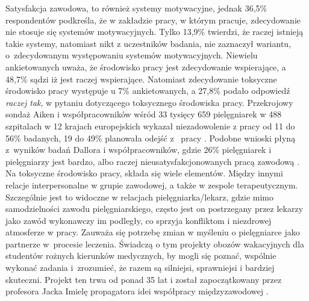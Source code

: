 \documentclass[a4paper,12pt,twoside,openright]{mwrep}
\begin{document}
Satysfakcja zawodowa, to również systemy motywacyjne, jednak 36,5\% respondentów podkreśla, że w zakładzie pracy, w którym pracuje, zdecydowanie nie stosuje się systemów motywacyjnych. Tylko 13,9\% twierdzi, że raczej istnieją takie systemy, natomiast nikt z uczestników badania, nie zaznaczył wariantu, o~zdecydowanym występowaniu systemów motywacyjnych.  Niewielu  ankietowanych uważa, że środowisko pracy jest zdecydowanie wspierające, a 48,7\%  sądzi  iż jest raczej wspierające. Natomiast zdecydowanie toksyczne środowisko pracy występuje u 7\%  ankietowanych, a 27,8\%  podało odpowiedź \textit{raczej tak}, w pytaniu dotyczącego toksycznego środowiska pracy.  Przekrojowy sondaż Aiken i współpracowników wśród  33 tysięcy 659 pielęgniarek w 488 szpitalach w 12 krajach europejskich wykazał niezadowolenie z pracy  od 11 do 56\% badanych, 19 do 49\% planowała odejść z~ pracy \cite{termedia}. Podobne wnioski płyną z~wyników badań Dallora i współpracowników, gdzie 26\% pielęgniarek i pielęgniarzy jest bardzo, albo raczej nieusatysfakcjonowanych pracą zawodową \cite{dalora}. Na toksyczne środowisko pracy, składa się wiele elementów. Między innymi relacje interpersonalne w grupie zawodowej, a także w zespole terapeutycznym. Szczególnie jest to widoczne w relacjach pielęgniarka/lekarz, gdzie mimo samodzielności zawodu pielęgniarskiego, często jest on postrzegany przez lekarzy jako zawód wykonawczy im  podległy, co sprzyja konfliktom i niezdrowej atmosferze w pracy. Zauważa się potrzebę zmian w myśleniu o pielęgniarce jako partnerze w~procesie leczenia. Świadczą o tym projekty obozów wakacyjnych dla studentów rożnych kierunków medycznych, by mogli się poznać, wspólnie wykonać zadania i~zrozumieć, że razem są silniejsi, sprawniejsi i bardziej skuteczni. Projekt ten trwa od ponad 35 lat i został zapoczątkowany przez profesora Jacka Imielę propagatora idei współpracy międzyzawodowej \cite{imiela}.
\end{document}
